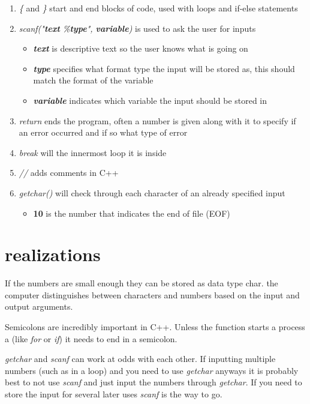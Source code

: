 \documentclass{article}
\begin{document}
\begin{enumerate}
    \item \textit{\{} and \textit{\}} start and end blocks of code, used with loops and if-else statements
    \item \textit{scanf("\textbf{text} \%\textbf{type}", \textbf{variable})} is used to ask the user for inputs
    \begin{itemize}
        \item \textit{\textbf{text}} is descriptive text so the user knows what is going on
        \item \textit{\textbf{type}} specifies what format type the input will be stored as, this should match the format of the variable
        \item \textit{\textbf{variable}} indicates which variable the input should be stored in
    \end{itemize}
    \item \textit{return} ends the program, often a number is given along with it to specify if an error occurred and if so what type of error
    \item \textit{break} will the innermost loop it is inside
    \item \textit{//} adds comments in C++
    \item \textit{getchar()} will check through each character of an already specified input
    \begin{itemize}
        \item \textbf{10} is the number that indicates the end of file (EOF)
    \end{itemize}
    
\end{enumerate}

\section{realizations}
If the numbers are small enough they can be stored as data type char. the computer distinguishes between characters and numbers based on the input and output arguments.

Semicolons are incredibly important in C++. Unless the function starts a process a (like \textit{for} or \textit{if}) it needs to end in a semicolon.

\textit{getchar} and \textit{scanf} can work at odds with each other. If inputting multiple numbers (such as in a loop) and you need to use \textit{getchar} anyways it is probably best to not use \textit{scanf} and just input the numbers through \textit{getchar}. If you need to store the input for several later uses \textit{scanf} is the way to go.
\end{document}
